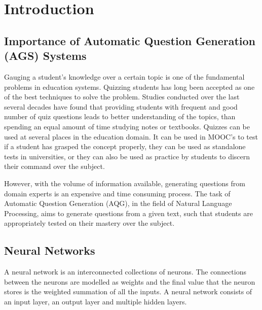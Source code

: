 %

\chapter{Introduction}

\section{Importance of Automatic Question Generation (AGS) Systems}

Gauging a student’s knowledge over a certain topic is one of the fundamental
problems in education systems. Quizzing students has long been accepted as one
of the best techniques to solve the problem. Studies conducted over the last
several decades have found that providing students with frequent and good number
of quiz questions leads to better understanding of the topics, than spending an
equal amount of time studying notes or textbooks. Quizzes can be used at several
places in the education domain. It can be used in MOOC’s to test if a student
has  grasped the concept properly, they can be used as standalone tests in
universities, or they can also be used as practice by students to discern their
command over the subject. 

However, with the volume of information available, generating questions from
domain experts is an expensive and time consuming process. The task of Automatic
Question Generation (AQG), in the field of Natural Language Processing, aims to
generate questions from a given text, such that students are appropriately
tested on their mastery over the subject.

\section{Neural Networks}

A neural network is an interconnected collections of neurons. The connections
between the neurons are modelled as weights and the final value that the neuron
stores is the weighted summation of all the inputs. A neural network consists of
an input layer, an output layer and multiple hidden layers.

